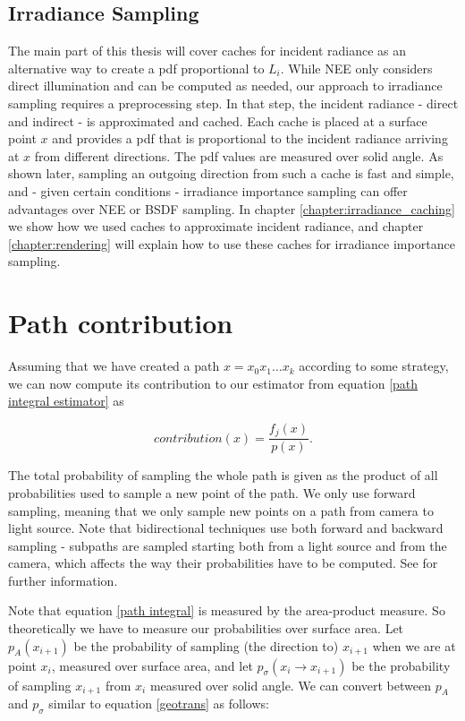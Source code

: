 \subsection{Irradiance Sampling}
The main part of this thesis will cover caches for incident radiance as an alternative way to create a pdf proportional to $L_i$. While NEE only considers direct illumination and can be computed as needed, our approach to irradiance sampling requires a preprocessing step. In that step, the incident radiance - direct and indirect - is approximated and cached. Each cache is placed at a surface point $x$ and provides a pdf that is proportional to the incident radiance arriving at $x$ from different directions. The pdf values are measured over solid angle. As shown later, sampling an outgoing direction from such a cache is fast and simple, and - given certain conditions - irradiance importance sampling can offer advantages over NEE or BSDF sampling.\newline
In chapter \ref{chapter:irradiance_caching} we show how we used caches to approximate incident radiance, and chapter \ref{chapter:rendering} will explain how to use these caches for irradiance importance sampling.




\section{Path contribution}

Assuming that we have created a path $x = x_0x_1\dots x_k$ according to some strategy, we can now compute its contribution to our estimator from equation \ref{path integral estimator} as

\begin{equation*}
contribution(x) = \frac{f_j(x)}{p(x)}.
\end{equation*}

The total probability of sampling the whole path is given as the product of all probabilities used to sample a new point of the path. We only use forward sampling, meaning that we only sample new points on a path from camera to light source. Note that bidirectional techniques use both forward and backward sampling - subpaths are sampled starting both from a light source and from the camera, which affects the way their probabilities have to be computed. See \cite[chapter 10]{veachdiss} for further information.

Note that equation \ref{path integral} is measured by the area-product measure. So theoretically we have to measure our probabilities over surface area. Let $p_A(x_{i+1})$ be the probability of sampling (the direction to) $x_{i+1}$ when we are at point $x_i$, measured over surface area, and let $p_\sigma(x_i \rightarrow x_{i+1})$ be the probability of sampling $x_{i+1}$ from $x_i$ measured over solid angle. We can convert between $p_A$ and $p_\sigma$ similar to equation \ref{geotrans} as follows:

